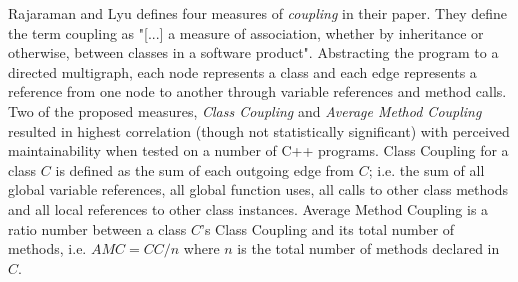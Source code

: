 Rajaraman and Lyu \cite{rajaraman1992reliability} defines four measures of
\textit{coupling} in their paper. They define the term coupling as "[...] a
measure of association, whether by inheritance or otherwise, between classes in
a software product". Abstracting the program to a directed multigraph, each
node represents a class and each edge represents a reference from one node to
another through variable references and method calls. Two of the proposed
measures, \textit{Class Coupling} and \textit{Average Method Coupling} resulted
in highest correlation (though not statistically significant) with perceived
maintainability when tested on a number of C++ programs. Class Coupling for a
class $C$ is defined as the sum of each outgoing edge from $C$; i.e. the sum of
all global variable references, all global function uses, all calls to other
class methods and all local references to other class instances. Average Method
Coupling is a ratio number between a class $C$'s Class Coupling and its total
number of methods, i.e. $AMC = CC / n$ where $n$ is the total number of methods
declared in $C$.
